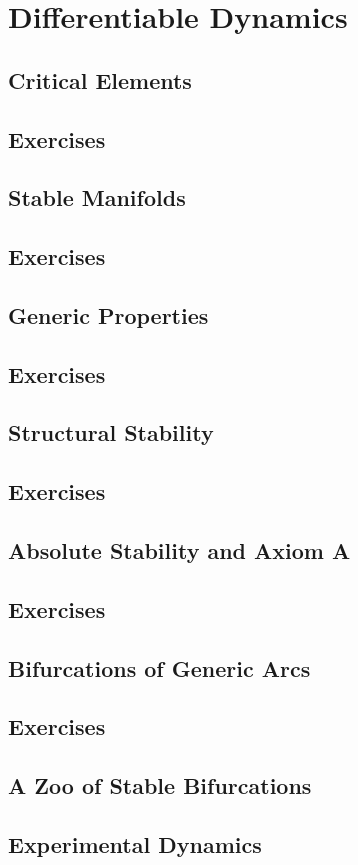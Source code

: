 \chapter{Differentiable Dynamics}
\section{Critical Elements}
\section*{Exercises}
\section{Stable Manifolds}
\section*{Exercises}
\section{Generic Properties}
\section*{Exercises}
\section{Structural Stability}
\section*{Exercises}
\section{Absolute Stability and Axiom A}
\section*{Exercises}
\section{Bifurcations of Generic Arcs}
\section*{Exercises}
\section{A Zoo of Stable Bifurcations}
\section{Experimental Dynamics}
